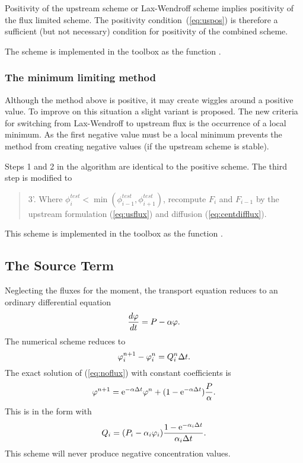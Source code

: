 Positivity of the upstream scheme or Lax-Wendroff scheme implies
positivity of the flux limited scheme. The positivity
condition~(\ref{eq:uspos}) is therefore a sufficient (but not
necessary) condition for positivity of the combined scheme.

The scheme is implemented in the toolbox as the function .



\subsubsection{The minimum limiting method}

Although the method above is positive, it may create wiggles around a
positive value.  To improve on this situation a slight variant is
proposed.  The new criteria for switching from Lax-Wendroff to
upstream flux is the occurrence of a local minimum.  As the first
negative value must be a local minimum prevents the method from
creating negative values (if the upstream scheme is stable).

Steps 1 and 2 in the algorithm are identical to the positive scheme.
The third step is modified to 
\begin{quote}
  3'. Where $\phi_i^{test} < \min (\phi_{i-1}^{test},\phi_{i+1}^{test})$, 
      recompute $F_i$ and $F_{i-1}$ by the
      upstream formulation (\ref{eq:usflux}) and diffusion 
      (\ref{eq:centdifflux}).
\end{quote}

This scheme is implemented in the toolbox as the function .

\subsection{The Source Term}

Neglecting the fluxes for the moment, the transport equation
 reduces to an ordinary differential equation
\begin{equation}\label{eq:noflux}
  \frac{d\varphi}{dt} = P - \alpha \varphi .
\end{equation}
The numerical scheme  reduces to
\begin{equation}\label{eq:numnoflux}
  \varphi_i^{n+1} - \varphi_i^n = Q_i^n \Delta t .
\end{equation}
The exact solution of (\ref{eq:noflux}) with
constant coefficients is
\begin{equation}
  \varphi^{n+1} = \mathrm{e}^{-\alpha \Delta t} \varphi^n + 
                 (1 - \mathrm{e}^{- \alpha \Delta t}) \frac{P}{\alpha} .
\end{equation}
This is in the form  with
\begin{equation}\label{eq:kildediskret}
  Q_i = (P_i - \alpha_i \varphi_i) 
         \frac{1-\mathrm{e}^{- \alpha_i \Delta t}}{\alpha_i \Delta t} .
\end{equation}
This scheme will never produce negative concentration values.

